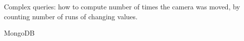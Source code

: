 \documentclass[nocopyrightspace]{acm_proc_article-sp}
\begin{document}

Complex queries: how to compute number of times the camera was moved, by counting number of runs of changing values.

MongoDB







%
%
%
%
%
%
%
%       








  

\end{document}
